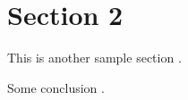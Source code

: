 \section{Section 2}
\label{sec:section2}

This is another sample section \citeauthor[Section 3]{adam}.







Some conclusion \citeyear[Chapter 7, Theorem 1]{boyd2011distributed}.
